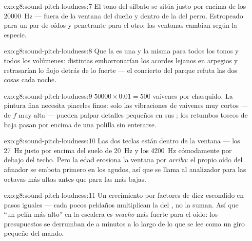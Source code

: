 \begin{solution}{exo:g8:sound-pitch-loudness:7}
El tono del silbato se sitúa justo por encima de los \qty{20000}{Hz}
--- fuera de la ventana del dueño y dentro de la del perro. Estropeado
para un par de oídos y penetrante para el otro: las ventanas cambian
según la especie.
\end{solution}

\begin{solution}{exo:g8:sound-pitch-loudness:8}
Que la  es una y la misma para todos los tonos y todos
los volúmenes:  distintas emborronarían los acordes
lejanos en arpegios y retrasarían lo flojo detrás de lo fuerte --- el
concierto del parque refuta las dos cosas cada noche.
\end{solution}

\begin{solution}{exo:g8:sound-pitch-loudness:9}
$50000 \times 0.01 = 500$ vaivenes por chasquido. La pintura fina
necesita pinceles finos: solo las vibraciones de vaivenes muy
cortos --- de $f$ muy alta --- pueden palpar detalles pequeños en sus
; los retumbos toscos de baja  pasan por
encima de una polilla sin enterarse.
\end{solution}

\begin{solution}{exo:g8:sound-pitch-loudness:10}
Las dos teclas están dentro de la ventana --- los \qty{27}{Hz} justo
por encima del suelo de \qty{20}{Hz} y los \qty{4200}{Hz} cómodamente
por debajo del techo. Pero la edad erosiona la ventana por
\emph{arriba}: el propio oído del afinador se embota primero en los
agudos, así que se llama al analizador para las octavas más altas antes
que para las más bajas.
\end{solution}

\begin{solution}{exo:g8:sound-pitch-loudness:11}
Un crecimiento por factores de diez escondido en pasos iguales --- cada
pocos peldaños multiplican la  del , no la suman. Así
que ``un pelín más alto'' en la escalera es \emph{mucho} más fuerte
para el oído: los presupuestos se derrumban de  a minutos a
lo largo de lo que se lee como un giro pequeño del mando.
\end{solution}

